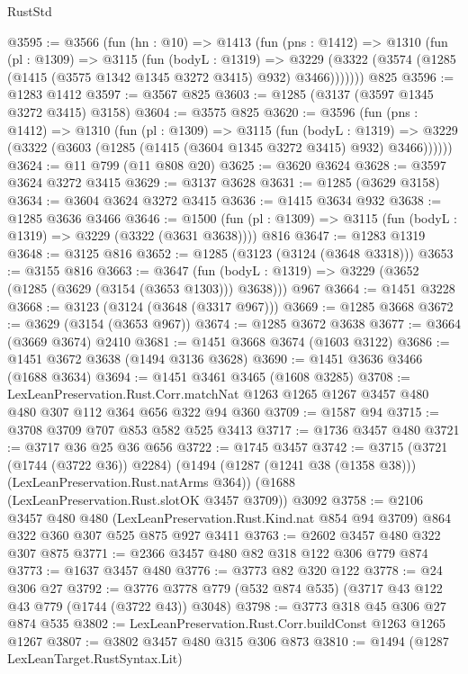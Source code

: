 \begin{lexlean}{RustStd}
\begin{coremodule}
@3595 := @3566
    (fun (hn : @10) =>
    @1413
      (fun (pns : @1412) =>
      @1310
        (fun (pl : @1309) =>
        @3115
          (fun (bodyL : @1319) =>
          @3229 (@3322 (@3574 (@1285 (@1415 (@3575 @1342 @1345 @3272 @3415) @932) @3466)))))))
    @825
@3596 := @1283 @1412
@3597 := @3567 @825
@3603 := @1285 (@3137 (@3597 @1345 @3272 @3415) @3158)
@3604 := @3575 @825
@3620 := @3596
    (fun (pns : @1412) =>
    @1310
      (fun (pl : @1309) =>
      @3115
        (fun (bodyL : @1319) =>
        @3229 (@3322 (@3603 (@1285 (@1415 (@3604 @1345 @3272 @3415) @932) @3466))))))
@3624 := @11 @799 (@11 @808 @20)
@3625 := @3620 @3624
@3628 := @3597 @3624 @3272 @3415
@3629 := @3137 @3628
@3631 := @1285 (@3629 @3158)
@3634 := @3604 @3624 @3272 @3415
@3636 := @1415 @3634 @932
@3638 := @1285 @3636 @3466
@3646 := @1500 (fun (pl : @1309) => @3115 (fun (bodyL : @1319) => @3229 (@3322 (@3631 @3638)))) @816
@3647 := @1283 @1319
@3648 := @3125 @816
@3652 := @1285 (@3123 (@3124 (@3648 @3318)))
@3653 := @3155 @816
@3663 := @3647
    (fun (bodyL : @1319) => @3229 (@3652 (@1285 (@3629 (@3154 (@3653 @1303))) @3638)))
    @967
@3664 := @1451 @3228
@3668 := @3123 (@3124 (@3648 (@3317 @967)))
@3669 := @1285 @3668
@3672 := @3629 (@3154 (@3653 @967))
@3674 := @1285 @3672 @3638
@3677 := @3664 (@3669 @3674) @2410
@3681 := @1451 @3668 @3674 (@1603 @3122)
@3686 := @1451 @3672 @3638 (@1494 @3136 @3628)
@3690 := @1451 @3636 @3466 (@1688 @3634)
@3694 := @1451 @3461 @3465 (@1608 @3285)
@3708 := LexLeanPreservation.Rust.Corr.matchNat
    @1263
    @1265
    @1267
    @3457
    @480
    @480
    @307
    @112
    @364
    @656
    @322
    @94
    @360
@3709 := @1587 @94
@3715 := @3708 @3709 @707 @853 @582 @525 @3413
@3717 := @1736 @3457 @480
@3721 := @3717 @36 @25 @36 @656
@3722 := @1745 @3457
@3742 := @3715
    (@3721 (@1744 (@3722 @36)) @2284)
    (@1494 (@1287 (@1241 @38 (@1358 @38))) (LexLeanPreservation.Rust.natArms @364))
    (@1688 (LexLeanPreservation.Rust.slotOK @3457 @3709))
    @3092
@3758 := @2106
    @3457
    @480
    @480
    (LexLeanPreservation.Rust.Kind.nat @854 @94 @3709)
    @864
    @322
    @360
    @307
    @525
    @875
    @927
    @3411
@3763 := @2602 @3457 @480 @322 @307 @875
@3771 := @2366 @3457 @480 @82 @318 @122 @306 @779 @874
@3773 := @1637 @3457 @480
@3776 := @3773 @82 @320 @122
@3778 := @24 @306 @27
@3792 := @3776 @3778 @779 (@532 @874 @535) (@3717 @43 @122 @43 @779 (@1744 (@3722 @43)) @3048)
@3798 := @3773 @318 @45 @306 @27 @874 @535
@3802 := LexLeanPreservation.Rust.Corr.buildConst @1263 @1265 @1267
@3807 := @3802 @3457 @480 @315 @306 @873
@3810 := @1494 (@1287 LexLeanTarget.RustSyntax.Lit)

\end{coremodule}
\end{lexlean}
